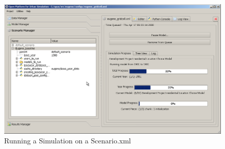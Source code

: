 \begin{figure}[htp]
\begin{center}
\includegraphics[scale=0.4]{graphics/opus-running.png}
\end{center}
\caption{Running a Simulation on a Scenario.xml}
\label{fig:opus-running}
\end{figure}

